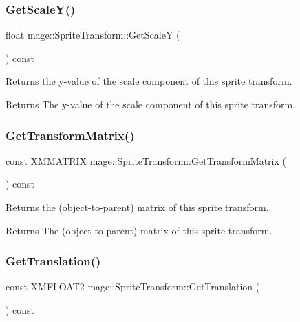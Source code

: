 \subsubsection{\texorpdfstring{Get\+Scale\+Y()}{GetScaleY()}}
{\footnotesize\ttfamily float mage\+::\+Sprite\+Transform\+::\+Get\+ScaleY (\begin{DoxyParamCaption}{ }\end{DoxyParamCaption}) const\hspace{0.3cm}{\ttfamily [noexcept]}}

Returns the y-\/value of the scale component of this sprite transform.

\begin{DoxyReturn}{Returns}
The y-\/value of the scale component of this sprite transform. 
\end{DoxyReturn}
\hypertarget{structmage_1_1_sprite_transform_a4e5d58a02d951c021e3e41e4ac183d0d}{}\label{structmage_1_1_sprite_transform_a4e5d58a02d951c021e3e41e4ac183d0d} 
\subsubsection{\texorpdfstring{Get\+Transform\+Matrix()}{GetTransformMatrix()}}
{\footnotesize\ttfamily const X\+M\+M\+A\+T\+R\+IX mage\+::\+Sprite\+Transform\+::\+Get\+Transform\+Matrix (\begin{DoxyParamCaption}{ }\end{DoxyParamCaption}) const\hspace{0.3cm}{\ttfamily [noexcept]}}

Returns the (object-\/to-\/parent) matrix of this sprite transform.

\begin{DoxyReturn}{Returns}
The (object-\/to-\/parent) matrix of this sprite transform. 
\end{DoxyReturn}
\hypertarget{structmage_1_1_sprite_transform_ae8103fdc37f52d294d3703709949a30c}{}\label{structmage_1_1_sprite_transform_ae8103fdc37f52d294d3703709949a30c} 
\subsubsection{\texorpdfstring{Get\+Translation()}{GetTranslation()}}
{\footnotesize\ttfamily const X\+M\+F\+L\+O\+A\+T2 mage\+::\+Sprite\+Transform\+::\+Get\+Translation (\begin{DoxyParamCaption}{ }\end{DoxyParamCaption}) const\hspace{0.3cm}{\ttfamily [noexcept]}}

